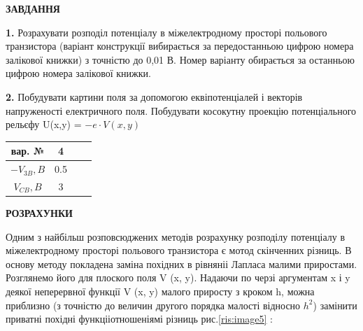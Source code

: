 \documentclass[14pt,a4paper]{scrartcl}
\begin{document}
\begin{center}
\textbf{ЗАВДАННЯ} \\
\end{center}

\textbf{1.} Розрахувати розподіл потенціалу в міжелектродному просторі польового транзистора (варіант конструкції вибирається за передостанньою цифрою номера залікової книжки) з точністю до 0,01 В. Номер варіанту обирається за останньою цифрою номера залікової книжки.\par

\textbf{2.} Побудувати картини поля за допомогою еквіпотенціалей і векторів напруженості електричного поля. Побудувати косокутну проекцію потенціального рельєфу U(x,y) = $-e\cdot V(x,y)$\\
\begin{figure}[h]
\end{figure}

\begin{center}
\vspace{0.1cm}
\begin{Large}
\begin{tabular}{ | c |  c |  c |  c |}
\hline
вар. № & 4   \\
\hline
$-V_{3B},B$ & 0.5   \\
\hline
$V_{CB}, B$ & 3   \\
\hline
\end{tabular}
\end{Large}
\vspace{0.2cm}
\end{center}

\newpage
\begin{center}
\textbf{РОЗРАХУНКИ} \\
\end{center}

Одним з найбільш розповсюджених методів розрахунку розподілу потенціалу в міжелектродному просторі польового транзистора є мотод скінченних різниць. В основу методу покладена заміна похідних в рівняніі Лапласа малими приростами. Розглянемо його для плоского поля V (x, y). Надаючи по черзі аргументам x і y деякої неперервної функції V (x, y) малого приросту з кроком h, можна приблизно (з точністю до величин другого порядка малості відносно
 $h^2$) замінити приватні похідні функцііотношеніямі різниць рис.\ref{ris:image5} :
\end{document}
